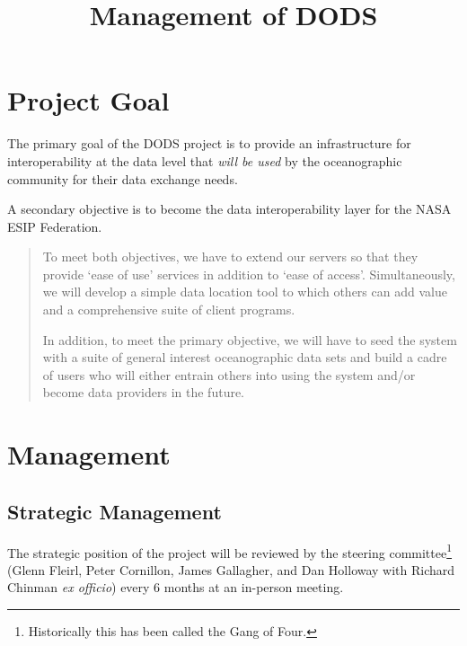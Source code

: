 \documentclass{article}
\begin{document}
\title{Management of DODS}
\maketitle

\section*{Project Goal}

The primary goal of the DODS project is to provide an infrastructure
for interoperability at the data level that \emph{will be used} 
by the oceanographic community for their data exchange needs.

A secondary objective is to become the data interoperability layer 
for the NASA ESIP Federation.

\begin{quote}
  To meet both objectives, we have to extend our servers so that 
  they provide `ease of use' services in addition to `ease of 
  access'. Simultaneously, we will develop a simple data location 
  tool to which others can add value and a comprehensive suite of 
  client programs. 

  In addition, to meet the primary objective, we will have to
  seed the system with a suite of general interest oceanographic
  data sets and build a cadre of users who will either entrain
  others into using the system and/or become data providers in
  the future.
\end{quote}

\section*{Management}
\subsection*{Strategic Management}
The strategic position of the project will be reviewed by the steering
committee\footnote{Historically this has been called the Gang of Four.}
(Glenn Fleirl, Peter Cornillon, James Gallagher, and Dan Holloway with
Richard Chinman \emph{ex officio}) every 6 months at an in-person meeting.
  
\end{document}
